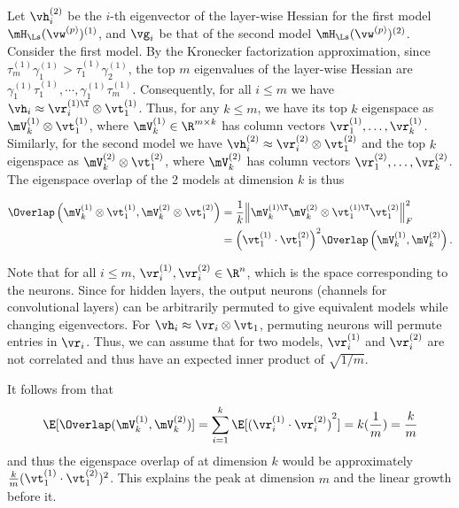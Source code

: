 \begin{proofof}{}
Let $\vh^{(2)}_i$ be the $i$-th eigenvector of the layer-wise Hessian for the first model $\mH_\Ls(\vw^{(p)})^{(1)}$, and $\vg_i$ be that of the second model $\mH_\Ls(\vw^{(p)})^{(2)}$. Consider the first model. By the Kronecker factorization approximation, since $\tau^{(1)}_m\gamma^{(1)}_1 > \tau^{(1)}_1\gamma^{(1)}_2$, the top $m$ eigenvalues of the layer-wise Hessian are $\gamma^{(1)}_1\tau^{(1)}_1,\cdots, \gamma^{(1)}_1\tau^{(1)}_m$. Consequently, for all $i \leq m$ we have $\vh_i \approx \vr^{(1)\T}_i\otimes \vt^{(1)}_1$.
Thus, for any $k \leq m$, we have its top $k$ eigenspace as $\mV_k^{(1)} \otimes \vt_1^{(1)}$, where $\mV^{(1)}_k\in\R^{m\times k}$ has column vectors $\vr_1^{(1)}, \ldots, \vr_k^{(1)}$.
Similarly, for the second model we have $\vh^{(2)}_i \approx \vr^{(2)}_i\otimes \vt^{(2)}_1$ and the top $k$ eigenspace as $\mV^{(2)}_k \otimes \vt^{(2)}_1$, where $\mV^{(2)}_k$ has column vectors $\vr^{(2)}_1, \ldots, \vr^{(2)}_k$.
The eigenspace overlap of the 2 models at dimension $k$ is thus

\begin{align}
    \begin{split}
        \Overlap\left(\mV^{(1)}_k \otimes \vt^{(1)}_1, \mV^{(2)}_k \otimes \vt^{(2)}_1\right) &=\frac{1}{k}{\left\|\mV_k^{(1)\T}\mV^{(2)}_k \otimes \vt^{(1)\T}_1\vt^{(2)}_1\right\|}^2_F\\
    &= {\left(\vt^{(1)}_1 \cdot \vt^{(2)}_1\right)}^2\Overlap\left(\mV^{(1)}_k, \mV^{(2)}_k\right).
    \end{split}
\label{eqn:appendix_model_overlap}
\end{align}

Note that for all $i\leq m$, $\vr^{(1)}_i, \vr^{(2)}_i \in \R^n$, which is the space corresponding to the neurons. Since for hidden layers, the output neurons (channels for convolutional layers) can be arbitrarily permuted to give equivalent models while changing eigenvectors. For $\vh_i \approx \vr_i\otimes \vt_1$, permuting neurons will permute entries in $\vr_i$. Thus, we can assume that for two models, $\vr^{(1)}_i$ and $\vr^{(2)}_i$ are not correlated and thus have an expected inner product of $\sqrt{1/m}$.

It follows from  that 
\begin{equation}
    \E[\Overlap(\mV^{(1)}_k, \mV^{(2)}_k)] = \sum_{i=1}^k\E[{(\vr_i^{(1)}\cdot\vr_i^{(2)})}^2] = k(\frac{1}{m}) = \frac{k}{m}
\end{equation}
and thus the eigenspace overlap of at dimension $k$ would be approximately $\frac{k}{m}(\vt^{(1)}_1 \cdot \vt^{(2)}_1)^2$. This explains the peak at dimension $m$ and the linear growth before it.
\end{proofof}

